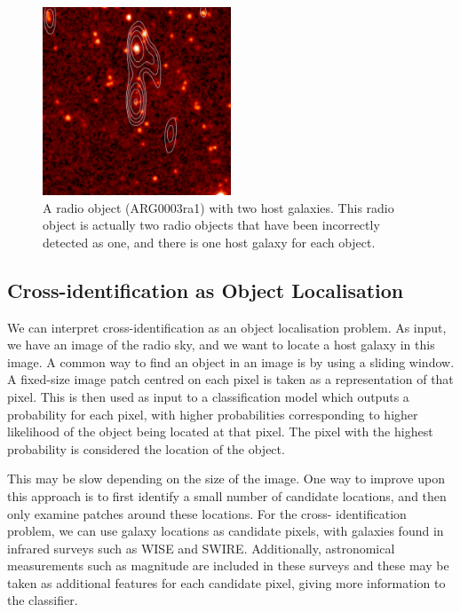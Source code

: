   \begin{figure}
    \centering
    \includegraphics[width=0.5\textwidth]{images/CI0370C1_heatmap+contours.png}
    \caption{A radio object (ARG0003ra1) with two host galaxies. This radio
      object is actually two radio objects that have been incorrectly detected
      as one, and there is one host galaxy for each object.}
    \label{fig:two-hosts}
  \end{figure}

  \subsection{Cross-identification as Object Localisation}
  \label{sec:object-localisation}

    We can interpret cross-identification as an object localisation problem. As
    input, we have an image of the radio sky, and we want to locate a host
    galaxy in this image. A common way to find an object in an image is by using
    a sliding window. A fixed-size image patch centred on each pixel is taken as
    a representation of that pixel. This is then used as input to a
    classification model which outputs a probability for each pixel, with higher
    probabilities corresponding to higher likelihood of the object being located
    at that pixel. The pixel with the highest probability is considered the
    location of the object.

    This may be slow depending on the size of the image. One way to improve upon
    this approach is to first identify a small number of candidate locations,
    and then only examine patches around these locations. For the cross-%
    identification problem, we can use galaxy locations as candidate pixels,
    with galaxies found in infrared surveys such as WISE and SWIRE.
    Additionally, astronomical measurements such as magnitude are included in
    these surveys and these may be taken as additional features for each
    candidate pixel, giving more information to the classifier.

